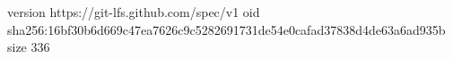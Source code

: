 version https://git-lfs.github.com/spec/v1
oid sha256:16bf30b6d669c47ea7626c9c5282691731de54e0cafad37838d4de63a6ad935b
size 336
